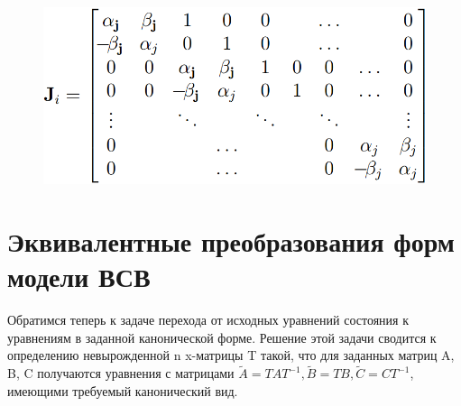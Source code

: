 \documentclass[14pt,a4paper,report]{report}
\begin{document}
\begin{itemize}
\begin{itemize}
		\begin{figure}[h!]
			\centering
			\includegraphics[scale = 0.40]{images/5.png}
			\label{image:5}
		\end{figure}
		
	\end{itemize}
		
\end{itemize}

\section{Эквивалентные преобразования форм модели ВСВ}

Обратимся теперь к задаче перехода от исходных уравнений состояния к уравнениям в заданной канонической форме. Решение этой задачи сводится к определению невырожденной n x-матрицы T такой, что для заданных матриц A, B, C получаются уравнения с матрицами $\widetilde{A}=TAT^{-1}, \widetilde{B}=TB, \widetilde{C}=CT^{-1}$, имеющими требуемый канонический вид.
\end{document}
